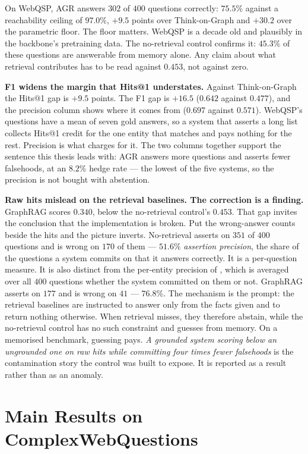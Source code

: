 On WebQSP, AGR answers $302$ of $400$ questions correctly: $75.5\%$ against
a reachability ceiling of $97.0\%$, $+9.5$ points
over Think-on-Graph and $+30.2$ over the parametric floor. The floor matters.
WebQSP is a decade old and plausibly in the backbone's pretraining data. The
no-retrieval control confirms it: $45.3\%$ of these questions are answerable
from memory alone. Any claim about what retrieval contributes has to be read
against $0.453$, not against zero.

\textbf{F1 widens the margin that Hits@1 understates.} Against Think-on-Graph
the Hits@1 gap is $+9.5$ points. The F1 gap is $+16.5$ ($0.642$ against
$0.477$), and the precision column shows where it comes from ($0.697$ against
$0.571$). WebQSP's questions have a mean of seven gold answers, so a system that
asserts a long list collects Hits@1 credit for the one entity that matches and
pays nothing for the rest. Precision is what charges for it. The two columns
together support the sentence this thesis leads with: AGR answers more questions
and asserts fewer falsehoods, at an $8.2\%$ hedge rate --- the lowest of the
five systems, so the precision is not bought with abstention.

\textbf{Raw hits mislead on the retrieval baselines. The correction is a
finding.} GraphRAG scores $0.340$, below the no-retrieval control's $0.453$.
That gap invites the conclusion that the implementation is broken. Put the
wrong-answer counts beside the hits and the picture inverts. No-retrieval
asserts on $351$ of $400$ questions and is wrong on $170$ of them --- $51.6\%$
\emph{assertion precision}, the share of the
questions a system commits on that it answers correctly. It is a per-question
measure. It is also distinct from the per-entity precision of ,
which is averaged over all $400$ questions whether the system committed on them
or not. GraphRAG asserts on $177$ and is wrong on $41$ --- $76.8\%$. The
mechanism is the prompt: the retrieval baselines are instructed to answer only
from the facts given and to return nothing otherwise. When retrieval misses,
they therefore abstain, while the no-retrieval control has no such constraint
and guesses from memory. On a memorised benchmark, guessing pays. \emph{A
grounded system scoring below an ungrounded one on raw hits while committing
four times fewer falsehoods} is the contamination story the control was built
to expose. It is reported as a result rather than as an anomaly.

\section{Main Results on ComplexWebQuestions}\label{sec:cwq-results}

